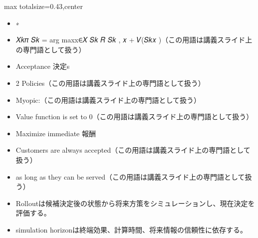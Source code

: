 \clearpage
{}
\begin{minipage}[t]{0.405\textwidth}
\begin{adjustbox}{max totalsize={\textwidth}{0.43\textheight},center}
\begin{minipage}{\textwidth}\scriptsize
{}\begin{itemize}
\item ∗
\item 𝑋𝑘𝜋 𝑆𝑘 = arg maxx∈𝑋 𝑆𝑘 𝑅 𝑆𝑘 , 𝑥 + 𝑉(𝑆𝑘𝑥 )（この用語は講義スライド上の専門語として扱う）
\item Acceptance 決定s
\item 2 Policies（この用語は講義スライド上の専門語として扱う）
\item Myopic:（この用語は講義スライド上の専門語として扱う）
\item Value function is set to 0（この用語は講義スライド上の専門語として扱う）
\item Maximize immediate 報酬
\item Customers are always accepted（この用語は講義スライド上の専門語として扱う）
\item as long as they can be served（この用語は講義スライド上の専門語として扱う）
\end{itemize}\begin{itemize}
\item Rolloutは候補決定後の状態から将来方策をシミュレーションし、現在決定を評価する。
\item simulation horizonは終端効果、計算時間、将来情報の信頼性に依存する。
\end{itemize}
\end{minipage}
\end{adjustbox}
\end{minipage}\hfill
